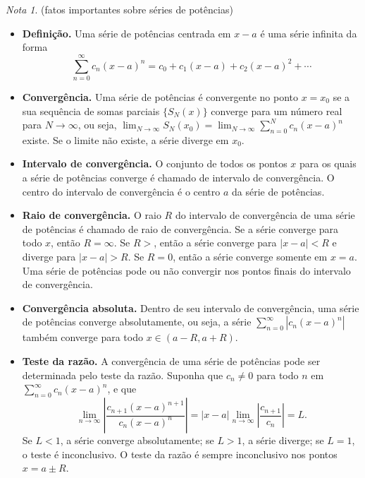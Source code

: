 \documentclass[12pt]{article}
\theoremstyle{plain}
\theoremstyle{definition}
\theoremstyle{remark}
\newtheorem*{rem}{Nota}
\begin{document}
\begin{rem} (fatos importantes sobre séries de potências)
    \begin{itemize}
        \item \textbf{Definição.} Uma série de potências centrada em \(x-a\) é uma série infinita da forma \begin{equation}\sum_{n=0}^{\infty} c_n (x-a)^n = c_0 + c_1(x-a) + c_2(x-a)^2 + \cdots\end{equation}
        \item \textbf{Convergência.} Uma série de potências é convergente no ponto \(x=x_0\) se a sua sequência de somas parciais \(\{S_N(x)\}\) converge para um número real para \(N\to\infty\), ou seja, \(\lim_{N\to\infty} S_N(x_0) = \lim_{N\to\infty} \sum_{n=0}^{N} c_n (x-a)^n\) existe. Se o limite não existe, a série diverge em \(x_0\).
        \item \textbf{Intervalo de convergência.} O conjunto de todos os pontos \(x\) para os quais a série de potências converge é chamado de intervalo de convergência. O centro do intervalo de convergência é o centro \(a\) da série de potências.
        \item \textbf{Raio de convergência.} O raio \(R\) do intervalo de convergência de uma série de potências é chamado de raio de convergência. Se a série converge para todo \(x\), então \(R=\infty\). Se \(R>\), então a série converge para \(|x-a|<R\) e diverge para \(|x-a|>R\). Se \(R=0\), então a série converge somente em \(x=a\). Uma série de potências pode ou não convergir nos pontos finais do intervalo de convergência.
        \item \textbf{Convergência absoluta.} Dentro de seu intervalo de convergência, uma série de potências converge absolutamente, ou seja, a série \(\sum_{n=0}^{\infty} |c_n (x-a)^n|\) também converge para todo \(x \in (a-R, a+R)\).
        \item \textbf{Teste da razão.} A convergência de uma série de potências pode ser determinada pelo teste da razão. Suponha que \(c_n\neq0\) para todo \(n\) em \(\sum_{n=0}^{\infty} c_n (x-a)^n\), e que 
        \begin{equation}
            \lim_{n\to\infty} \left| \frac{c_{n+1}(x-a)^{n+1}}{c_n (x-a)^n} \right| = |x-a| \lim_{n\to\infty} \left| \frac{c_{n+1}}{c_n} \right| = L.
        \end{equation}
        \noindent Se \(L<1\), a série converge absolutamente; se \(L>1\), a série diverge; se \(L=1\), o teste é inconclusivo. O teste da razão é sempre inconclusivo nos pontos \(x=a\pm R\).

\end{itemize}
\end{rem}
\end{document}
